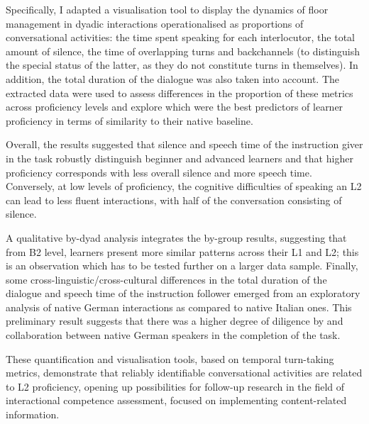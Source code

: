 \begin{stylecaption}
\textup{Specifically, I adapted a visualisation tool to display the dynamics of floor management in dyadic interactions operationalised as proportions of conversational activities: the time spent speaking for each interlocutor, the total amount of silence, the time of overlapping turns and backchannels (to distinguish the special status of the latter, as they do not constitute turns in themselves). In addition, the total duration of the dialogue was also taken into account. The extracted data were used to assess differences in the proportion of these metrics across proficiency levels and explore which were the best predictors of learner proficiency in terms of similarity to their native baseline.}
\end{stylecaption}

\begin{stylecaption}
\textup{Overall, the results suggested that silence and speech time of the instruction giver in the task robustly distinguish beginner and advanced learners and that higher proficiency corresponds with less overall silence and more speech time. Conversely, at low levels of proficiency, the cognitive difficulties of speaking an L2 can lead to less fluent interactions, with half of the conversation consisting of silence. }
\end{stylecaption}

\begin{stylecaption}
\textup{A qualitative by-dyad analysis integrates the by-group results, suggesting that from B2 level, learners present more similar patterns across their L1 and L2; this is an observation which has to be tested further on a larger data sample. Finally, some cross-linguistic/cross-cultural differences in the total duration of the dialogue and speech time of the instruction follower emerged from an exploratory analysis of native German interactions as compared to native Italian ones. This preliminary result suggests that there was a higher degree of diligence by and collaboration between native German speakers in the completion of the task. }
\end{stylecaption}

\begin{stylecaption}
\textup{These quantification and visualisation tools, based on temporal turn-taking metrics, demonstrate that reliably identifiable conversational activities are related to L2 proficiency, opening up possibilities for follow-up research in the field of interactional competence assessment, focused on implementing content-related information.}
\end{stylecaption}

